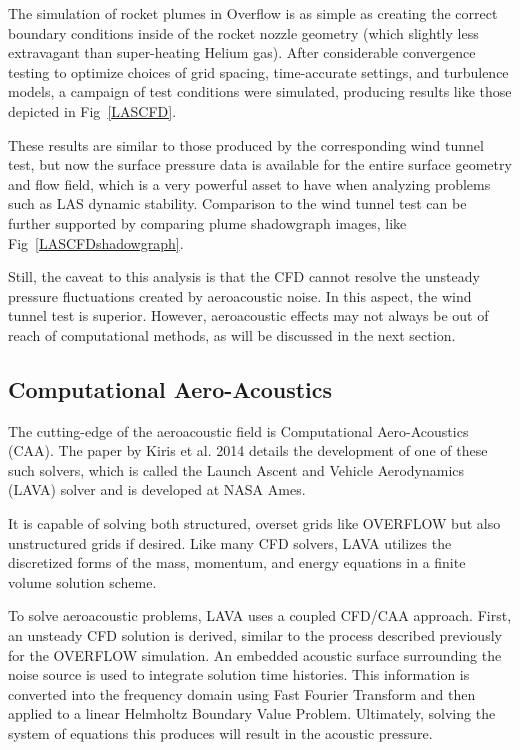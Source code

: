 \documentclass[]{aiaa-tc}%
\begin{document}
The simulation of rocket plumes in Overflow is as simple as creating the correct boundary conditions inside of the rocket nozzle geometry (which slightly less extravagant than super-heating Helium gas).  After considerable convergence testing to optimize choices of grid spacing, time-accurate settings, and turbulence models, a campaign of test conditions were simulated, producing results like those depicted in Fig~\ref{LASCFD}.

These results are similar to those produced by the corresponding wind tunnel test, but now the surface pressure data is available for the entire surface geometry and flow field, which is a very powerful asset to have when analyzing problems such as LAS dynamic stability.  Comparison to the wind tunnel test can be further supported by comparing plume shadowgraph images, like Fig~\ref{LASCFDshadowgraph}.

Still, the caveat to this analysis is that the CFD cannot resolve the unsteady pressure fluctuations created by aeroacoustic noise.  In this aspect, the wind tunnel test is superior.  However, aeroacoustic effects may not always be out of reach of computational methods, as will be discussed in the next section.

\subsection{Computational Aero-Acoustics}

The cutting-edge of the aeroacoustic field is Computational Aero-Acoustics (CAA).  The paper by Kiris et al. 2014 \cite{LAVA} details the development of one of these such solvers, which is called the Launch Ascent and Vehicle Aerodynamics (LAVA) solver and is developed at NASA Ames.

It is capable of solving both structured, overset grids like OVERFLOW but also unstructured grids if desired.  Like many CFD solvers, LAVA utilizes the discretized forms of the mass, momentum, and energy equations in a finite volume solution scheme.

To solve aeroacoustic problems, LAVA uses a coupled CFD/CAA approach.  First, an unsteady CFD solution is derived, similar to the process described previously for the OVERFLOW simulation.  An embedded acoustic surface surrounding the noise source is used to integrate solution time histories.  This information is converted into the frequency domain using Fast Fourier Transform and then applied to a linear Helmholtz Boundary Value Problem.  Ultimately, solving the system of equations this produces will result in the acoustic pressure.
\end{document}
